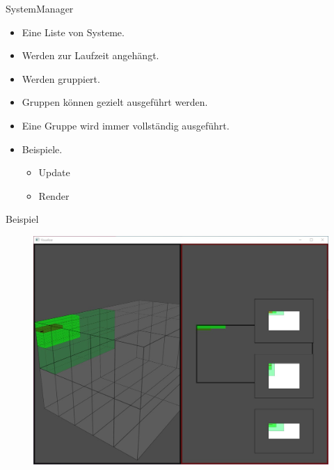 \documentclass{presentation}
\begin{document}
\begin{frame}{SystemManager}
    \begin{itemize}
        \item Eine Liste von Systeme.
        \item Werden zur Laufzeit angehängt.
        \item Werden gruppiert.
        \item Gruppen können gezielt ausgeführt werden.
        \item Eine Gruppe wird immer vollständig ausgeführt.
        \item Beispiele.
        \begin{itemize}
            \item Update
            \item Render
        \end{itemize}
    \end{itemize}
\end{frame}

\begin{frame}{Beispiel}
    \begin{figure}
        \includegraphics[scale=0.3]{visualizer.jpg}
    \end{figure}
\end{frame}
\end{document}
